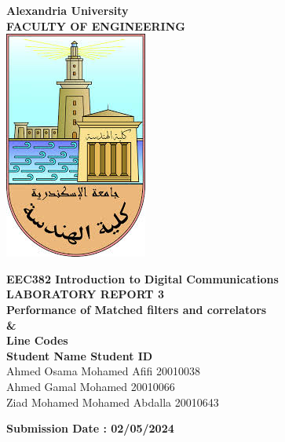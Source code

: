 \documentclass[a4paper, 12pt, english]{article}
\begin{document}
\begin{titlepage}
\begin{center}
\textbf{\LARGE Alexandria University}\\[0.5cm] 
\textbf{\large FACULTY OF ENGINEERING}\\[0.2cm]
\vspace{20pt}
\includegraphics{logo.png}\\[1cm]
\par
\vspace{20pt}
\textbf{\Large EEC382 Introduction to Digital Communications}\\
\vspace{15pt}
\myrule[1pt][7pt]
\textbf{\LARGE  LABORATORY REPORT 3}\\
\vspace{15pt}
\textbf{\large Performance of Matched filters and correlators \\
        \& \\
        Line Codes}\\
\myrule[1pt][7pt]
\vspace{25pt}
\textbf{\large \hspace{50pt}Student Name \hspace{60pt} Student ID}\\
Ahmed Osama Mohamed Afifi \hspace{60pt} 20010038 \\
Ahmed Gamal Mohamed \hspace{85pt} 20010066 \\
Ziad Mohamed Mohamed Abdalla \hspace{40pt} 20010643 \\

\vspace{45pt}
\end{center}

\par
\vfill
\begin{center}
\textbf{Submission Date : 02/05/2024}\\
\end{center}

\end{titlepage}
\end{document}
